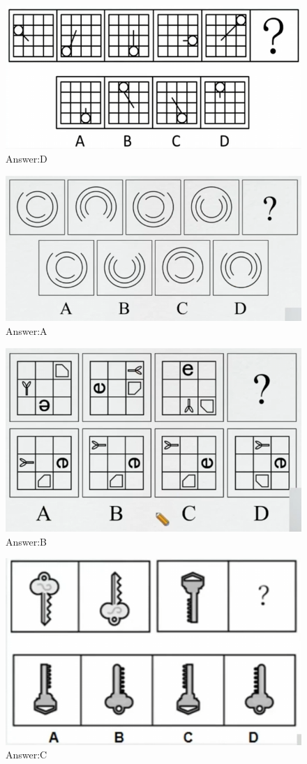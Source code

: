 \documentclass{article}
\numberwithin{equation}{section}						%
\numberwithin{figure}{section}							%
\begin{document}
\begin{sloppypar}
\begin{figure}[H]
     \centering
     \includegraphics[width=0.5\linewidth]{4.png}
		\caption{Answer:D}
 \end{figure}

\begin{figure}[H]
     \centering
     \includegraphics[width=0.5\linewidth]{5.png}
		\caption{Answer:A}
 \end{figure}

\begin{figure}[H]
     \centering
     \includegraphics[width=0.5\linewidth]{6.png}
		\caption{Answer:B}
 \end{figure}

\begin{figure}[H]
     \centering
     \includegraphics[width=0.5\linewidth]{7.png}
		\caption{Answer:C}
 \end{figure}


\end{sloppypar}
\end{document}

